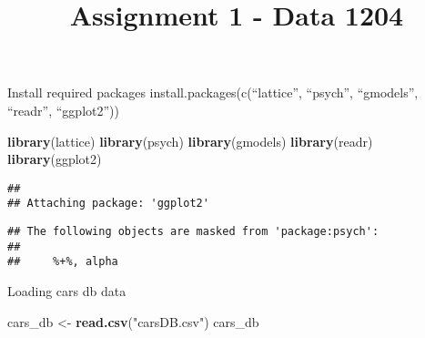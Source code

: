 \documentclass[
]{article}
\title{Assignment 1 - Data 1204}
\author{}
\date{\vspace{-2.5em}}
\newenvironment{Shaded}{\begin{snugshade}}{\end{snugshade}}
\newcommand{\KeywordTok}[1]{\textcolor[rgb]{0.13,0.29,0.53}{\textbf{#1}}}
\newcommand{\NormalTok}[1]{#1}
\newcommand{\StringTok}[1]{\textcolor[rgb]{0.31,0.60,0.02}{#1}}
\begin{document}
\maketitle

Install required packages install.packages(c(``lattice'', ``psych'',
``gmodels'', ``readr'', ``ggplot2''))

\begin{Shaded}
\begin{Highlighting}[]
\KeywordTok{library}\NormalTok{(lattice)}
\KeywordTok{library}\NormalTok{(psych)}
\KeywordTok{library}\NormalTok{(gmodels)}
\KeywordTok{library}\NormalTok{(readr)}
\KeywordTok{library}\NormalTok{(ggplot2)}
\end{Highlighting}
\end{Shaded}

\begin{verbatim}
## 
## Attaching package: 'ggplot2'
\end{verbatim}

\begin{verbatim}
## The following objects are masked from 'package:psych':
## 
##     %+%, alpha
\end{verbatim}

Loading cars db data

\begin{Shaded}
\begin{Highlighting}[]
\NormalTok{cars\_db \textless{}{-}}\StringTok{ }\KeywordTok{read.csv}\NormalTok{(}\StringTok{"carsDB.csv"}\NormalTok{)}
\NormalTok{cars\_db}
\end{Highlighting}
\end{Shaded}
\end{document}
